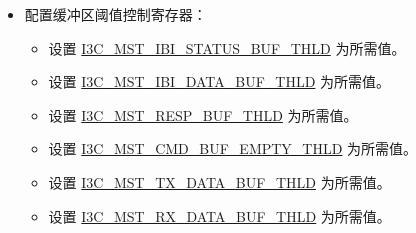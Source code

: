 \documentclass[main\_\_CN.tex]{subfiles}
\begin{document}
\begin{itemize}
\begin{itemize}
          \item I3C 推挽时序寄存器：
          \begin{itemize}
             \item 根据 I3C 推挽阶段所需的 SCL 高电平周期值，设置 \hyperref[fielddesc:I3CMSTREGI3CMSTPPHIGHPERIOD]{I3C\_MST\_I3C\_MST\_PP\_HIGH\_PERIOD}。
             \item 根据 I3C 推挽阶段所需的 SCL 低电平周期值，设置 \hyperref[fielddesc:I3CMSTREGI3CMSTPPLOWPERIOD]{I3C\_MST\_I3C\_MST\_PP\_LOW\_PERIOD}。
             \item 分别根据 I3C 在 SDR1、SDR2、SDR3 和 SDR4 速率模式下进行数据传输时所需的 SCL 推挽低电平周期值，设置 \hyperref[fielddesc:I3CMSTREGI3CMSTEXTLOWPERIOD1]{I3C\_MST\_I3C\_MST\_EXT\_LOW\_PERIOD1}、\hyperref[fielddesc:I3CMSTREGI3CMSTEXTLOWPERIOD2]{I3C\_MST\_I3C\_MST\_EXT\_LOW\_PERIOD2}、\hyperref[fielddesc:I3CMSTREGI3CMSTEXTLOWPERIOD3]{I3C\_MST\_I3C\_MST\_EXT\_LOW\_PERIOD3} 以及 \hyperref[fielddesc:I3CMSTREGI3CMSTEXTLOWPERIOD4]{I3C\_MST\_I3C\_MST\_EXT\_LOW\_PERIOD4}。
             \item 根据 I3C 读终止位（read termination bit）所需的扩展 SCL 推挽周期值，设置 \hyperref[fielddesc:I3CMSTREGI3CMSTTERMNTEXTLOWTIME]{I3C\_MST\_I3C\_MST\_TERMN\_T\_EXT\_LOW\_TIME}。
             \item 设置 \hyperref[fielddesc:I3CMSTREGSDAPPSAMPLETIME]{I3C\_MST\_SDA\_PP\_SAMPLE\_TIME} 为推挽阶段所需的 SDA 采样点。
             \item 设置 \hyperref[fielddesc:I3CMSTREGSDAPPTXHOLDTIME]{I3C\_MST\_SDA\_PP\_TX\_HOLD\_TIME} 为推挽阶段所需的 SDA 保持延迟。
         \end{itemize}
        \end{itemize}
        \item 配置缓冲区阈值控制寄存器：
        \begin{itemize}
            \item 设置 \hyperref[fielddesc:I3CMSTREGIBISTATUSBUFTHLD]{I3C\_MST\_IBI\_STATUS\_BUF\_THLD} 为所需值。
            \item 设置 \hyperref[fielddesc:I3CMSTREGIBIDATABUFTHLD]{I3C\_MST\_IBI\_DATA\_BUF\_THLD} 为所需值。
            \item 设置 \hyperref[fielddesc:I3CMSTREGRESPBUFTHLD]{I3C\_MST\_RESP\_BUF\_THLD} 为所需值。
            \item 设置 \hyperref[fielddesc:I3CMSTREGCMDBUFEMPTYTHLD]{I3C\_MST\_CMD\_BUF\_EMPTY\_THLD} 为所需值。
            \item 设置 \hyperref[fielddesc:I3CMSTREGTXDATABUFTHLD]{I3C\_MST\_TX\_DATA\_BUF\_THLD} 为所需值。
            \item 设置 \hyperref[fielddesc:I3CMSTREGRXDATABUFTHLD]{I3C\_MST\_RX\_DATA\_BUF\_THLD} 为所需值。
        \end{itemize}


\end{itemize}
\end{document}
